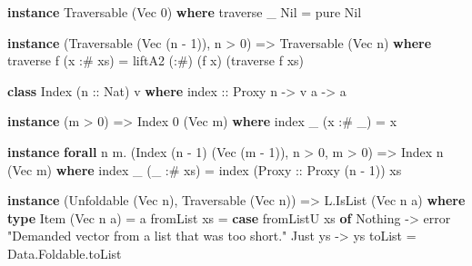 \documentclass[]{article}
\newenvironment{Shaded}{}{}
\newcommand{\DataTypeTok}[1]{\textcolor[rgb]{0.56,0.13,0.00}{#1}}
\newcommand{\DecValTok}[1]{\textcolor[rgb]{0.25,0.63,0.44}{#1}}
\newcommand{\FunctionTok}[1]{\textcolor[rgb]{0.02,0.16,0.49}{#1}}
\newcommand{\KeywordTok}[1]{\textcolor[rgb]{0.00,0.44,0.13}{\textbf{#1}}}
\newcommand{\NormalTok}[1]{#1}
\newcommand{\OperatorTok}[1]{\textcolor[rgb]{0.40,0.40,0.40}{#1}}
\newcommand{\OtherTok}[1]{\textcolor[rgb]{0.00,0.44,0.13}{#1}}
\newcommand{\StringTok}[1]{\textcolor[rgb]{0.25,0.44,0.63}{#1}}
\begin{document}
\begin{Shaded}
\begin{Highlighting}[]
\KeywordTok{instance} \DataTypeTok{Traversable}\NormalTok{ (}\DataTypeTok{Vec} \DecValTok{0}\NormalTok{) }\KeywordTok{where}
    \FunctionTok{traverse}\NormalTok{ \_ }\DataTypeTok{Nil} \OtherTok{=} \FunctionTok{pure} \DataTypeTok{Nil}

\KeywordTok{instance}\NormalTok{ (}\DataTypeTok{Traversable}\NormalTok{ (}\DataTypeTok{Vec}\NormalTok{ (n }\OperatorTok{{-}} \DecValTok{1}\NormalTok{)), n }\OperatorTok{>} \DecValTok{0}\NormalTok{) }\OtherTok{=>} \DataTypeTok{Traversable}\NormalTok{ (}\DataTypeTok{Vec}\NormalTok{ n) }\KeywordTok{where}
    \FunctionTok{traverse}\NormalTok{ f (x }\OperatorTok{:\#}\NormalTok{ xs) }\OtherTok{=}\NormalTok{ liftA2 (}\OperatorTok{:\#}\NormalTok{) (f x) (}\FunctionTok{traverse}\NormalTok{ f xs)}

\KeywordTok{class} \DataTypeTok{Index}\NormalTok{ (}\OtherTok{n ::} \DataTypeTok{Nat}\NormalTok{) v }\KeywordTok{where}
\OtherTok{    index ::} \DataTypeTok{Proxy}\NormalTok{ n }\OtherTok{{-}>}\NormalTok{ v a }\OtherTok{{-}>}\NormalTok{ a}

\KeywordTok{instance}\NormalTok{ (m }\OperatorTok{>} \DecValTok{0}\NormalTok{) }\OtherTok{=>} \DataTypeTok{Index} \DecValTok{0}\NormalTok{ (}\DataTypeTok{Vec}\NormalTok{ m) }\KeywordTok{where}
    \FunctionTok{index}\NormalTok{ \_ (x }\OperatorTok{:\#}\NormalTok{ \_) }\OtherTok{=}\NormalTok{ x}

\KeywordTok{instance} \KeywordTok{forall}\NormalTok{ n m}\OperatorTok{.}\NormalTok{ (}\DataTypeTok{Index}\NormalTok{ (n }\OperatorTok{{-}} \DecValTok{1}\NormalTok{) (}\DataTypeTok{Vec}\NormalTok{ (m }\OperatorTok{{-}} \DecValTok{1}\NormalTok{)), n }\OperatorTok{>} \DecValTok{0}\NormalTok{, m }\OperatorTok{>} \DecValTok{0}\NormalTok{) }\OtherTok{=>} \DataTypeTok{Index}\NormalTok{ n (}\DataTypeTok{Vec}\NormalTok{ m) }\KeywordTok{where}
    \FunctionTok{index}\NormalTok{ \_ (\_ }\OperatorTok{:\#}\NormalTok{ xs) }\OtherTok{=} \FunctionTok{index}\NormalTok{ (}\DataTypeTok{Proxy}\OtherTok{ ::} \DataTypeTok{Proxy}\NormalTok{ (n }\OperatorTok{{-}} \DecValTok{1}\NormalTok{)) xs}

\KeywordTok{instance}\NormalTok{ (}\DataTypeTok{Unfoldable}\NormalTok{ (}\DataTypeTok{Vec}\NormalTok{ n), }\DataTypeTok{Traversable}\NormalTok{ (}\DataTypeTok{Vec}\NormalTok{ n)) }\OtherTok{=>} \DataTypeTok{L.IsList}\NormalTok{ (}\DataTypeTok{Vec}\NormalTok{ n a) }\KeywordTok{where}
    \KeywordTok{type} \DataTypeTok{Item}\NormalTok{ (}\DataTypeTok{Vec}\NormalTok{ n a) }\OtherTok{=}\NormalTok{ a}
\NormalTok{    fromList xs }\OtherTok{=} \KeywordTok{case}\NormalTok{ fromListU xs }\KeywordTok{of}
                    \DataTypeTok{Nothing} \OtherTok{{-}>} \FunctionTok{error} \StringTok{"Demanded vector from a list that was too short."}
                    \DataTypeTok{Just}\NormalTok{ ys }\OtherTok{{-}>}\NormalTok{ ys}
\NormalTok{    toList      }\OtherTok{=}\NormalTok{ Data.Foldable.toList}
\end{Highlighting}
\end{Shaded}
\end{document}
